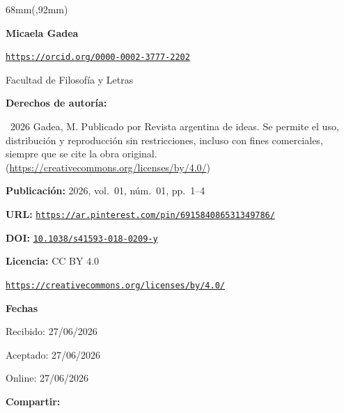 \documentclass{article}
\newlength{\gbbloquex}
\begin{document}
\begin{textblock*}{68mm}(\gbbloquex,92mm)
{\setlength{\leftskip}{0pt}\setlength{\parindent}{0pt}%
\noindent\begin{minipage}[t]{68mm}
\sffamily\small\setlength{\parskip}{1pt}
{\bfseries\color{azulrevista}Micaela Gadea}\par
{\scriptsize\texttt{\href{https://orcid.org/0000-0002-3777-2202}{https://orcid.org/0000-0002-3777-2202}}}\par
Facultad de Filosofía y Letras\par
\vspace{6pt}
{\bfseries\color{azulrevista!70}Derechos de autor\'ia:}\par
\textcopyright\ 2026 Gadea, M. Publicado por Revista argentina de ideas. Se permite el uso, distribución y reproducción sin restricciones, incluso con fines comerciales, siempre que se cite la obra original. (\href{https://creativecommons.org/licenses/by/4.0/}{https://creativecommons.org/licenses/by/4.0/})\par\vspace{6pt}
{\bfseries\color{azulrevista!70}Publicación:} 2026, vol.~01, n\'um.~01, pp.~1--4\par\vspace{6pt}
{\bfseries\color{azulrevista!70}URL:} {\scriptsize\texttt{\href{https://ar.pinterest.com/pin/691584086531349786/}{https://ar.pinterest.com/pin/691584086531349786/}}}\par\vspace{6pt}
{\bfseries\color{azulrevista!70}DOI:} {\scriptsize\texttt{\href{https://doi.org/10.1038/s41593-018-0209-y}{10.1038/s41593-018-0209-y}}}\par\vspace{6pt}
{\bfseries\color{azulrevista!70}Licencia:} CC BY 4.0\par
{\scriptsize\texttt{\href{https://creativecommons.org/licenses/by/4.0/}{https://creativecommons.org/licenses/by/4.0/}}}\par
\vspace{6pt}
{\bfseries\color{azulrevista!70}Fechas}\par\vspace{2pt}
Recibido: 27/06/2026\par
Aceptado: 27/06/2026\par
Online: 27/06/2026\par
\vspace{6pt}
\vspace{6pt}
{\bfseries\color{azulrevista!70}Compartir:}\par\vspace{3pt}

\end{minipage}}
\end{textblock*}
\end{document}
